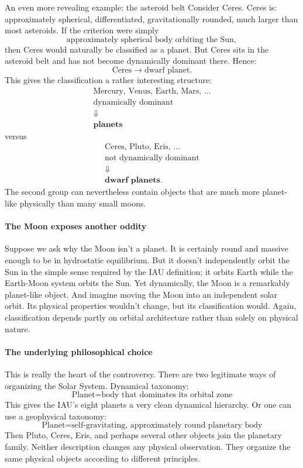 An even more revealing example: the asteroid belt
Consider Ceres.
Ceres is:
approximately spherical,
differentiated,
gravitationally rounded,
much larger than most asteroids.
If the criterion were simply
$$ \text{approximately spherical body orbiting the Sun}, $$
then Ceres would naturally be classified as a planet.
But Ceres sits in the asteroid belt and has not become dynamically dominant there.
Hence:
$$ \text{Ceres} \rightarrow \text{dwarf planet}. $$
This gives the classification a rather interesting structure:
$$ \begin{array}{c} \text{Mercury, Venus, Earth, Mars, ...}\\ \text{dynamically dominant}\\[4pt] \Downarrow\\ \textbf{planets} \end{array} $$
versus
$$ \begin{array}{c} \text{Ceres, Pluto, Eris, ...}\\ \text{not dynamically dominant}\\[4pt] \Downarrow\\ \textbf{dwarf planets}. \end{array} $$
The second group can nevertheless contain objects that are much more planet-like physically than many small moons.

\paragraph{ The Moon exposes another oddity}
Suppose we ask why the Moon isn't a planet.
It is certainly round and massive enough to be in hydrostatic equilibrium. But it doesn't independently orbit the Sun in the simple sense required by the IAU definition; it orbits Earth while the Earth-Moon system orbits the Sun.
Yet dynamically, the Moon is a remarkably planet-like object.
And imagine moving the Moon into an independent solar orbit.
Its physical properties wouldn't change, but its classification would.
Again, classification depends partly on orbital architecture rather than solely on physical nature.

\paragraph{ The underlying philosophical choice}
This is really the heart of the controversy.
There are two legitimate ways of organizing the Solar System.
Dynamical taxonomy:
$$ \boxed{\text{Planet} = \text{body that dominates its orbital zone}} $$
This gives the IAU's eight planets a very clean dynamical hierarchy.
Or one can use a geophysical taxonomy:
$$ \boxed{\text{Planet} = \text{self-gravitating, approximately round planetary body}} $$
Then Pluto, Ceres, Eris, and perhaps several other objects join the planetary family.
Neither description changes any physical observation. They organize the same physical objects according to different principles.

